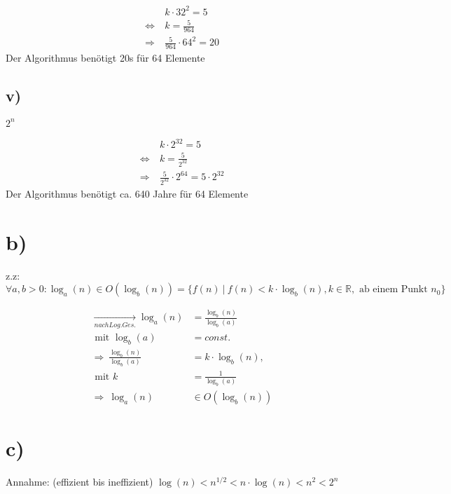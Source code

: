 \documentclass[12pt, a4paper, reqno]{amsart}
\begin{document}
    \begin{align}
    &k\cdot 32^2 = 5\\
    \Leftrightarrow\  & k = \frac 5 {964} \\
    \Rightarrow\  & \frac 5 {964} \cdot 64^2 = 20
    \end{align}
    Der Algorithmus benötigt 20s für 64 Elemente
    
    \subsection*{v)} $2^n$
    
    \begin{align}
    &k\cdot 2^{32} = 5\\
    \Leftrightarrow\  & k = \frac 5 {2^{32}} \\
    \Rightarrow\  & \frac 5 {2^{32}} \cdot 2^{64} = 5\cdot 2^{32}
    \end{align}
    Der Algorithmus benötigt ca. 640 Jahre für 64 Elemente
    
    
    \section*{b)}
    z.z: $\forall a,b>0: \log_a(n) \in O(\log_b(n)) = \{ f(n)\ |\ f(n)<k\cdot \log_b(n), k\in \mathbb R, \text{ ab einem Punkt } n_0 \}$
    
    \begin{align}
        \xrightarrow[nach Log.Ges.]{} \log_a(n)&=\frac{\log_b(n)}{\log_b(a)}\\
        \text{ mit } \log_b(a) &= const.\\
        \Rightarrow\  \frac{\log_b(n)}{\log_b(a)} &= k\cdot \log_b(n),\\
        \text{ mit } k&=\frac 1 {\log_b(a)}\\
        \Rightarrow\  \log_a(n)&\in O(\log_b(n))
    \end{align}
    
    \section*{c)}
    Annahme: (effizient bis ineffizient) $\log(n) < n^{1/2} < n\cdot \log(n) < n^2 < 2^n$
    
\end{document}
